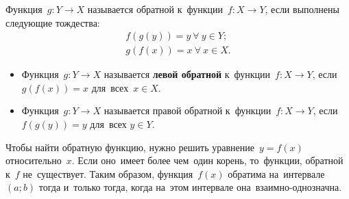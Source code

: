 \documentclass[]{scrartcl}
\begin{document}
{{Функция~${\displaystyle g:Y\to X}$ называется обратной к~функции~${\displaystyle f:X\to Y}$, если выполнены следующие тождества:
\begin{equation}\label{eq:inverse-function-identity}
\begin{aligned}
f(g(y))=y\ \forall\ y \in Y;\\
g(f(x))=x\ \forall\ x \in X.
\end{aligned}
\end{equation}
\begin{itemize}
	\item Функция~${\displaystyle g:Y \to X}$ называется \textbf{левой обратной} к~функции~${\displaystyle f:X \to Y}$, если~${\displaystyle g(f(x))=x}$ для~всех~${\displaystyle x\in X}$.
	\item Функция~${\displaystyle g:Y\to X}$ называется правой обратной к~функции~${\displaystyle f:X\to Y}$, если ${\displaystyle f(g(y))=y}$ для~всех ${\displaystyle y\in Y}$.
\end{itemize}
Чтобы найти обратную функцию, нужно решить уравнение~${\displaystyle y=f(x)}$ относительно~$ {\displaystyle x}$. Если оно~имеет более чем~один корень, то~функции, обратной к~${\displaystyle f}$ не~существует. Таким образом, функция~${\displaystyle f(x)}$ обратима на~интервале~${\displaystyle (a;b)}$ тогда и~только тогда, когда на~этом интервале она~взаимно-однозначна.

}}
\end{document}
